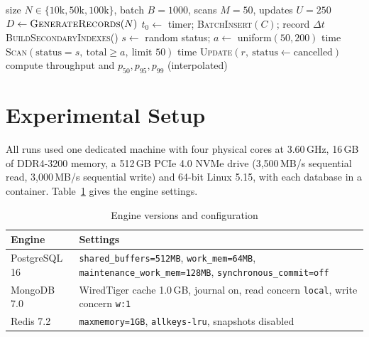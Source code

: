 \documentclass[conference,a4paper]{IEEEtran}
\newcommand{\code}[1]{\texttt{\small #1}}
\begin{document}
\begin{algorithm}[t]
\caption{Ingestion, scan and update pipeline}
\label{alg:bench}
\begin{algorithmic}[1]
\REQUIRE size $N\in\{10\text{k},50\text{k},100\text{k}\}$, batch $B=1000$, scans $M=50$, updates $U=250$
\STATE $D \leftarrow \textsc{GenerateRecords}(N)$
  \STATE $t_0 \leftarrow$ timer;\; \textsc{BatchInsert}$(C)$;\; record $\Delta t$
\ENDFOR
\STATE \textsc{BuildSecondaryIndexes}()
  \STATE $s \leftarrow$ random status;\; $a \leftarrow$ uniform$(50,200)$
  \STATE time \textsc{Scan}$(\text{status}=s,\ \text{total}\ge a,\ \text{limit }50)$
\ENDFOR
{}
  \STATE time \textsc{Update}$(r,\ \text{status}\leftarrow\text{cancelled})$
\ENDFOR
\STATE compute throughput and $p_{50},p_{95},p_{99}$ (interpolated)
\end{algorithmic}
\end{algorithm}

\section{Experimental Setup}
All runs used one dedicated machine with four physical cores at 3.60\,GHz, 16\,GB of DDR4-3200 memory, a 512\,GB PCIe 4.0 NVMe drive (3,500\,MB/s sequential read, 3,000\,MB/s sequential write) and 64-bit Linux 5.15, with each database in a container. Table~\ref{tab:config} gives the engine settings.

\begin{table}[t]
\caption{Engine versions and configuration}
\label{tab:config}
\centering
\footnotesize
\begin{tabularx}{\columnwidth}{@{}l>{\raggedright\arraybackslash}X@{}}
\toprule
Engine & Settings \\
\midrule
PostgreSQL 16 & \code{shared\_buffers=512MB}, \code{work\_mem=64MB}, \code{maintenance\_work\_mem=128MB}, \code{synchronous\_commit=off} \\
MongoDB 7.0 & WiredTiger cache 1.0\,GB, journal on, read concern \code{local}, write concern \code{w:1} \\
Redis 7.2 & \code{maxmemory=1GB}, \code{allkeys-lru}, snapshots disabled \\
\bottomrule
\end{tabularx}
\end{table}
\end{document}
